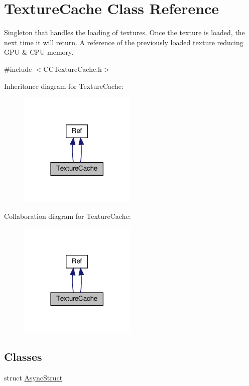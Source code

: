 \hypertarget{classTextureCache}{}\section{Texture\+Cache Class Reference}
\label{classTextureCache}


Singleton that handles the loading of textures. Once the texture is loaded, the next time it will return. A reference of the previously loaded texture reducing G\+PU \& C\+PU memory.  




{\ttfamily \#include $<$C\+C\+Texture\+Cache.\+h$>$}



Inheritance diagram for Texture\+Cache\+:
\nopagebreak
\begin{figure}[H]
\begin{center}
\leavevmode
\includegraphics[width=158pt]{classTextureCache__inherit__graph}
\end{center}
\end{figure}


Collaboration diagram for Texture\+Cache\+:
\nopagebreak
\begin{figure}[H]
\begin{center}
\leavevmode
\includegraphics[width=158pt]{classTextureCache__coll__graph}
\end{center}
\end{figure}
\subsection*{Classes}
\begin{DoxyCompactItemize}
\item 
struct \hyperlink{structTextureCache_1_1AsyncStruct}{Async\+Struct}
\end{DoxyCompactItemize}
